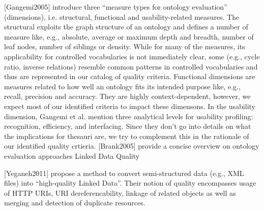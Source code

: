 [Gangemi2005] introduce three “measure types for ontology evaluation” (dimensions), i.e. structural, functional and usability-related measures. The structural exploits the graph structure of an ontology and defines a number of measure like, e.g., absolute, average or maximum depth and breadth, number of leaf nodes, number of siblings or density. While for many of the measures, its applicability for controlled vocabularies is not immediately clear, some (e.g., cycle ratio, inverse relations) resemble common patterns in controlled vocabularies and thus are represented in our catalog of quality criteria. Functional dimensions are measures related to how well an ontology fits its intended purpose like, e.g., recall, precision and accuracy. They are highly context-dependent, however, we expect most of our identified criteria to impact these dimensons. In the usability dimension, Gangemi et al. mention three analytical levels for usability profiling: recognition, efficiency, and interfacing. Since they don’t go into details on what the implications for thesauri are, we try to complement this in the rationale of our identified quality crtieria. [Brank2005] provide a concise overview on ontology evaluation approaches
Linked Data Quality

[Yeganeh2011] propose a method to convert semi-structured data (e.g., XML files) into “high-quality Linked Data”. Their notion of quality encompasses usage of HTTP URIs, URI dereferencability, linkage of related objects as well as merging and detection of duplicate resources.
